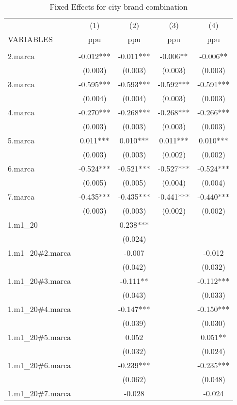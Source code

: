 \begin{longtable}{lcccc} 
\caption{Fixed Effects for city-brand combination}\label{tab:1}\\	
	\hline
 & (1) & (2) & (3) & (4) \\
VARIABLES & ppu & ppu & ppu & ppu \\ \hline
 &  &  &  &  \\
2.marca & -0.012*** & -0.011*** & -0.006** & -0.006** \\
 & (0.003) & (0.003) & (0.003) & (0.003) \\
3.marca & -0.595*** & -0.593*** & -0.592*** & -0.591*** \\
 & (0.004) & (0.004) & (0.003) & (0.003) \\
4.marca & -0.270*** & -0.268*** & -0.268*** & -0.266*** \\
 & (0.003) & (0.003) & (0.003) & (0.003) \\
5.marca & 0.011*** & 0.010*** & 0.011*** & 0.010*** \\
 & (0.003) & (0.003) & (0.002) & (0.002) \\
6.marca & -0.524*** & -0.521*** & -0.527*** & -0.524*** \\
 & (0.005) & (0.005) & (0.004) & (0.004) \\
7.marca & -0.435*** & -0.435*** & -0.441*** & -0.440*** \\
 & (0.003) & (0.003) & (0.002) & (0.002) \\
1.m1\_20 &  & 0.238*** &  &  \\
 &  & (0.024) &  &  \\
1.m1\_20\#2.marca &  & -0.007 &  & -0.012 \\
 &  & (0.042) &  & (0.032) \\
1.m1\_20\#3.marca &  & -0.111** &  & -0.112*** \\
 &  & (0.043) &  & (0.033) \\
1.m1\_20\#4.marca &  & -0.147*** &  & -0.150*** \\
 &  & (0.039) &  & (0.030) \\
1.m1\_20\#5.marca &  & 0.052 &  & 0.051** \\
 &  & (0.032) &  & (0.024) \\
1.m1\_20\#6.marca &  & -0.239*** &  & -0.235*** \\
 &  & (0.062) &  & (0.048) \\
1.m1\_20\#7.marca &  & -0.028 &  & -0.024 \\

\end{longtable}
